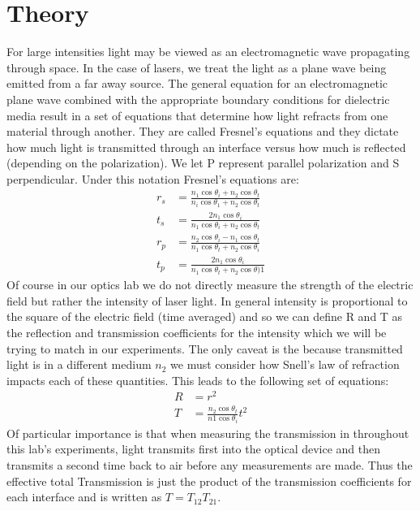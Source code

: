 \documentclass[letter, 11pt, onecolumn]{article}
\begin{document}
\section*{Theory}
For large intensities light may be viewed as an electromagnetic wave propagating through space. In the case of lasers, we treat the light as a plane wave being emitted from a far away source. The general equation for an electromagnetic plane wave combined with the appropriate boundary conditions for dielectric media result in a set of equations that determine how light refracts from one material through another. They are called Fresnel's equations and they dictate how much light is transmitted through an interface versus how much is reflected (depending on the polarization). We let P represent parallel polarization and S perpendicular. Under this notation Fresnel's equations are: 
	\begin{align}
		r_s &= \frac{n_1\cos\theta_i+n_2\cos\theta_t}{n_i\cos\theta_1+n_2\cos\theta_t} \\ 
		t_s &= \frac{2n_1\cos\theta_i}{n_1\cos\theta_i+n_2\cos\theta_t} \\ 
		r_p &= \frac{n_2\cos\theta_i-n_1\cos\theta_t}{n_1\cos\theta_t+n_2\cos\theta_i} \\ 
		t_p &= \frac{2n_1\cos\theta_i}{n_1\cos\theta_t+n_2\cos\theta)1}
	\end{align}
Of course in our optics lab we do not directly measure the strength of the electric field but rather the intensity of laser light. In general intensity is proportional to the square of the electric field (time averaged) and so we can define R and T as the reflection and transmission coefficients for the intensity which we will be trying to match in our experiments. The only caveat is the because transmitted light is in a different medium $n_2$ we must consider how Snell's law of refraction impacts each of these quantities. This leads to the following set of equations: 
	\begin{align}
		R &= r^2 \\ 
		T &= \frac{n_2\cos\theta_t}{n1\cos\theta_i}t^2
	\end{align} 
Of particular importance is that when measuring the transmission in throughout this lab's experiments, light transmits first into the optical device and then transmits a second time back to air before any measurements are made. Thus the effective total Transmission is just the product of the transmission coefficients for each interface and is written as $T = T_{12}T_{21}$.\\ 
\end{document}
